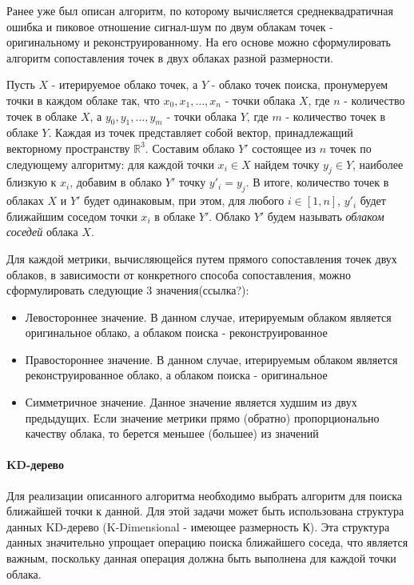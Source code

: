 Ранее уже был описан алгоритм, по которому вычисляется среднеквадратичная ошибка
и пиковое отношение сигнал-шум по двум облакам точек - оригинальному и
реконструированному. На его основе можно сформулировать алгоритм сопоставления
точек в двух облаках разной размерности.

Пусть $X$ - итерируемое облако точек, а $Y$ - облако точек поиска, пронумеруем
точки в каждом облаке так, что $x_{0}, x_{1}, \dots, x_{n}$ - точки облака $X$,
где $n$ - количество точек в облаке $X$, а $y_{0}, y_{1}, \dots, y_{m}$ - точки
облака $Y$, где $m$ - количество точек в облаке $Y$. Каждая из точек
представляет собой вектор, принадлежащий векторному пространству
$\mathbb{R}^{3}$. Составим облако $Y'$ состоящее из $n$ точек по следующему
алгоритму: для каждой точки $x_{i} \in X$ найдем точку $y_{j} \in Y$, наиболее
близкую к $x_{i}$, добавим в облако $Y'$ точку $y'_{i} = y_{j}$. В итоге,
количество точек в облаках $X$ и $Y'$ будет одинаковым, при этом, для любого $i
\in \left[1, n\right]$, $y'_{i}$ будет ближайшим соседом точки $x_{i}$ в облаке
$Y'$. Облако $Y'$ будем называть \textit{облаком соседей} облака $X$.

Для каждой метрики, вычисляющейся путем прямого сопоставления точек двух
облаков, в зависимости от конкретного способа сопоставления, можно
сформулировать следующие 3 значения(ссылка?):

\begin{itemize}
    \item Левостороннее значение. В данном случае, итерируемым облаком является
    оригинальное облако, а облаком поиска - реконструированное
    \item Правостороннее значение. В данном случае, итерируемым облаком является
    реконструированное облако, а облаком поиска - оригинальное
    \item Симметричное значение. Данное значение является худшим из двух
    предыдущих. Если значение метрики прямо (обратно) пропорционально качеству
    облака, то берется меньшее (большее) из значений
\end{itemize}

\paragraph{KD-дерево}

Для реализации описанного алгоритма необходимо выбрать алгоритм для поиска
ближайшей точки к данной. Для этой задачи может быть использована структура
данных KD-дерево (K-Dimensional - имеющее размерность
К)\cite[23]{PointCloudAnalysis}. Эта структура данных значительно упрощает
операцию поиска ближайшего соседа, что является важным, поскольку данная
операция должна быть выполнена для каждой точки облака.

